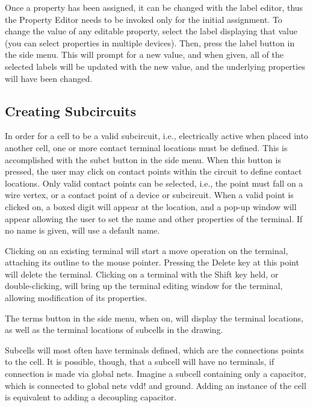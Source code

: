 Once a property has been assigned, it can be changed with the label
editor, thus the {\cb Property Editor} needs to be invoked only for
the initial assignment.  To change the value of any editable property,
select the label displaying that value (you can select properties in
multiple devices).  Then, press the {\cb label} button in the side
menu.  This will prompt for a new value, and when given, all of the
selected labels will be updated with the new value, and the underlying
properties will have been changed.

\subsection{Creating Subcircuits}

In order for a cell to be a valid subcircuit, i.e., electrically
active when placed into another cell, one or more contact terminal
locations must be defined.  This is accomplished with the {\cb subct}
button in the side menu.  When this button is pressed, the user may
click on contact points within the circuit to define contact
locations.  Only valid contact points can be selected, i.e., the point
must fall on a wire vertex, or a contact point of a device or
subcircuit.  When a valid point is clicked on, a boxed digit will
appear at the location, and a pop-up window will appear allowing the
user to set the name and other properties of the terminal.  If no name
is given, {\Xic} will use a default name.

Clicking on an existing terminal will start a move operation on the
terminal, attaching its outline to the mouse pointer.  Pressing the
{\kb Delete} key at this point will delete the terminal.  Clicking on
a terminal with the {\kb Shift} key held, or double-clicking, will
bring up the terminal editing window for the terminal, allowing
modification of its properties.

The {\cb terms} button in the side menu, when on, will display the
terminal locations, as well as the terminal locations of subcells in
the drawing.

Subcells will most often have terminals defined, which are the
connections points to the cell.  It is possible, though, that a
subcell will have no terminals, if connection is made via global nets. 
Imagine a subcell containing only a capacitor, which is connected to
global nets {\vt vdd!} and ground.  Adding an instance of the cell is
equivalent to adding a decoupling capacitor.

